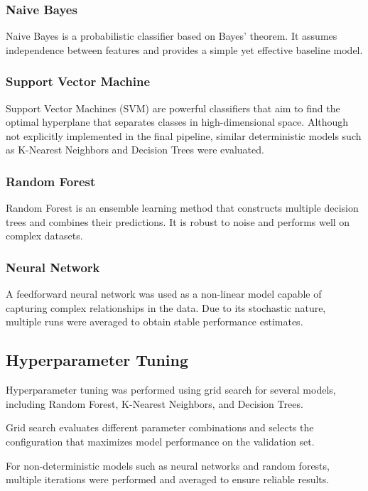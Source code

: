 \documentclass[12pt,a4paper]{article}
\begin{document}
\subsubsection{Naive Bayes}

Naive Bayes is a probabilistic classifier based on Bayes' theorem. It assumes independence between features and provides a simple yet effective baseline model.

\subsubsection{Support Vector Machine}

Support Vector Machines (SVM) are powerful classifiers that aim to find the optimal hyperplane that separates classes in high-dimensional space. Although not explicitly implemented in the final pipeline, similar deterministic models such as K-Nearest Neighbors and Decision Trees were evaluated.

\subsubsection{Random Forest}

Random Forest is an ensemble learning method that constructs multiple decision trees and combines their predictions. It is robust to noise and performs well on complex datasets.

\subsubsection{Neural Network}

A feedforward neural network was used as a non-linear model capable of capturing complex relationships in the data. Due to its stochastic nature, multiple runs were averaged to obtain stable performance estimates.

\subsection{Hyperparameter Tuning}

Hyperparameter tuning was performed using grid search for several models, including Random Forest, K-Nearest Neighbors, and Decision Trees.

Grid search evaluates different parameter combinations and selects the configuration that maximizes model performance on the validation set.

For non-deterministic models such as neural networks and random forests, multiple iterations were performed and averaged to ensure reliable results.
\end{document}
